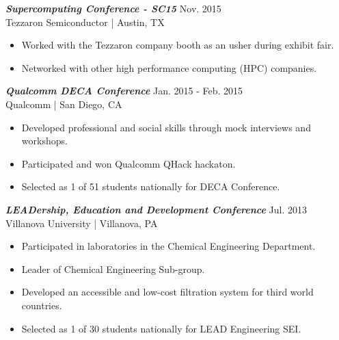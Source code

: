 \documentclass[letter]{res}
\begin{document}
\begin{resume}
\vspace{-2mm}

{\sl \textbf{Supercomputing Conference - SC15}} \hfill Nov. 2015\\
Tezzaron Semiconductor | Austin, TX \newline

 \vspace{-4mm}

 \begin{itemize}
 \item Worked with the Tezzaron company booth as an usher during exhibit fair.
 \item Networked with other high performance computing (HPC) companies.
 \end{itemize}

\vspace{-2mm}

{\sl \textbf{Qualcomm DECA Conference}} \hfill Jan. 2015 - Feb. 2015\\
Qualcomm | San Diego, CA \newline

 \vspace{-4mm}

 \begin{itemize}
 \item Developed professional and social skills through mock interviews and workshops.
 \item Participated and won Qualcomm QHack hackaton.
 \item Selected as 1 of 51 students nationally for DECA Conference.
 \end{itemize}

\vspace{-2mm}

{\sl \textbf{LEADership, Education and Development Conference}} \hfill Jul. 2013\\
Villanova University | Villanova, PA \newline

 \vspace{-4mm}

\begin{itemize}
\item Participated in laboratories in the Chemical Engineering Department.
\item Leader of Chemical Engineering Sub-group.
\item Developed an accessible and low-cost filtration system for third world countries.
\item Selected as 1 of 30 students nationally for LEAD Engineering SEI.
\end{itemize}


\end{resume}
\end{document}
